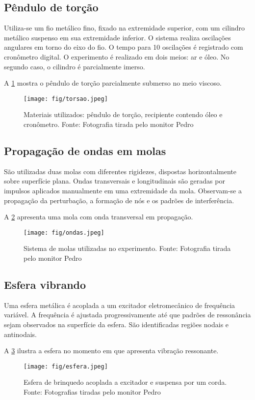 \subsection{Pêndulo de torção}

Utiliza-se um fio metálico fino, fixado na extremidade superior, com um cilindro metálico suspenso em sua extremidade inferior. O sistema realiza oscilações angulares em torno do eixo do fio. O tempo para 10 oscilações é registrado com cronômetro digital. O experimento é realizado em dois meios: ar e óleo. No segundo caso, o cilindro é parcialmente imerso.

A \cref{fig:torsao} mostra o pêndulo de torção parcialmente submerso no meio viscoso.

\begin{figure}[H]
    \centering
    \texttt{[image: fig/torsao.jpeg]}
    \caption{Materiais utilizados: pêndulo de torção, recipiente contendo óleo e cronômetro. Fonte: Fotografia tirada pelo monitor Pedro}
    \label{fig:torsao}
\end{figure}

\subsection{Propagação de ondas em molas}

São utilizadas duas molas com diferentes rigidezes, dispostas horizontalmente sobre superfície plana. Ondas transversais e longitudinais são geradas por impulsos aplicados manualmente em uma extremidade da mola. Observam-se a propagação da perturbação, a formação de nós e os padrões de interferência.

A \cref{fig:ondas} apresenta uma mola com onda transversal em propagação.

\begin{figure}[H]
    \centering
    \texttt{[image: fig/ondas.jpeg]}
    \caption{Sistema de molas utilizadas no experimento. Fonte: Fotografia tirada pelo monitor Pedro}
    \label{fig:ondas}
\end{figure}

\subsection{Esfera vibrando}

Uma esfera metálica é acoplada a um excitador eletromecânico de frequência variável. A frequência é ajustada progressivamente até que padrões de ressonância sejam observados na superfície da esfera. São identificadas regiões nodais e antinodais.

A \cref{fig:esfera} ilustra a esfera no momento em que apresenta vibração ressonante.

\begin{figure}[H]
    \centering
    \texttt{[image: fig/esfera.jpeg]}
    \caption{Esfera de brinquedo acoplada a excitador e suspensa por um corda. Fonte: Fotografias tiradas pelo monitor Pedro}
    \label{fig:esfera}
\end{figure}
